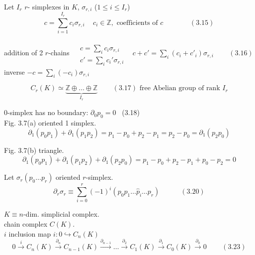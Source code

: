 \documentclass[twoside]{amsart}
\begin{document}
Let $I_r$ $r$- simplexes in $K$, $\sigma_{r,i}$ ($1 \leq i \leq I_r$) 
\begin{equation}
c = \sum_{i=1}^{I_r} c_i \sigma_{r,i} \quad \, c_i \in \mathbb{Z}, \text{ coefficients of $c$ } \quad \quad \quad \, (3.15)
\end{equation}

addition of 2 $r$-chains $\begin{aligned} & \quad \\ 
  & c = \sum_i c_i \sigma_{r,i} \\ 
  & c' = \sum_i c_i' \sigma_{r,i} \end{aligned}$ \quad \quad \, $c + c' = \sum_i (c_i + c'_i) \sigma_{r,i} \quad \quad \, (3.16)$ \\

inverse $-c  =\sum_i ( - c_i) \sigma_{r,i}$ 

\begin{equation}
C_r(K) \simeq \underbrace{\mathbb{Z} \oplus \dots \oplus \mathbb{Z}}_{ I_r} \quad \quad \, (3.17) \text{ free Abelian group of rank $I_r$}
\end{equation}


$0$-simplex has no boundary: $\partial_0 p_0 = 0$ \quad \, (3.18) \\

Fig. 3.7(a) oriented 1 simplex.  
\[
\partial_1 (p_0 p_1) + \partial_1 (p_1 p_2) = p_1 - p_0 + p_2 - p_1 = p_2 - p_0 = \partial_1 (p_2 p_0)
\]

Fig. 3.7(b) triangle. 
\[
\partial_1 (p_0 p_1) + \partial_1 (p_1 p_2) + \partial_1 (p_2 p_0) = p_1 - p_0 + p_2 - p_1 + p_0 - p_2 = 0 
\]

Let $\sigma_r(p_0 \dots p_r)$ oriented $r$-simplex.
\begin{equation}
\partial_r \sigma_r \equiv \sum_{i=0}^r (-1)^i (p_0 p_1 \dots \widehat{p}_i \dots p_r ) \quad \quad \quad (3.20)
\end{equation}


$K \equiv n$-dim. simplicial complex. \\

chain complex $C(K)$.  \\
$i$ inclusion map $i: 0 \hookrightarrow C_n(K)$
\begin{equation}
0 \xrightarrow{i} C_n(K) \xrightarrow{\partial_n} C_{n-1}(K) \xrightarrow{\partial_{n-1}} \dots \xrightarrow{\partial_2} C_1(K) \xrightarrow{\partial_1} C_0(K) \xrightarrow{\partial_0} 0 \quad \quad \, (3.23)
\end{equation}
\end{document}
